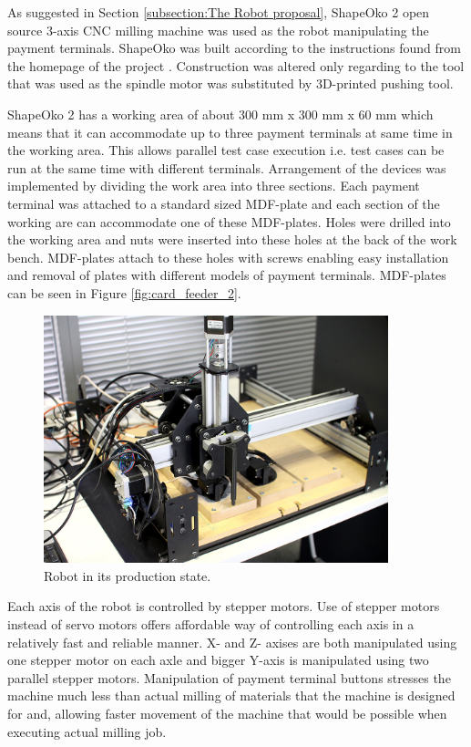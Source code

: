 As suggested in Section \ref{subsection:The Robot proposal}, ShapeOko 2 open source 3-axis CNC milling machine was used as the robot manipulating the payment terminals. ShapeOko was built according to the instructions found from the homepage of the project \citep{shapeoko}. Construction was altered only regarding to the tool that was used as the spindle motor was substituted by 3D-printed pushing tool.

ShapeOko 2 has a working area of about 300 mm x 300 mm x 60 mm which means that it can accommodate up to three payment terminals at same time in the working area. This allows parallel test case execution i.e. test cases can be run at the same time with different terminals. Arrangement of the devices was implemented by dividing the work area into three sections. Each payment terminal was attached to a standard sized MDF-plate and each section of the working are can accommodate one of these MDF-plates. Holes were drilled into the working area and nuts were inserted into these holes at the back of the work bench. MDF-plates attach to these holes with screws enabling easy installation and removal of plates with different models of payment terminals. MDF-plates can be seen in Figure \ref{fig:card_feeder_2}.

\begin{figure}[ht]
  \begin{center}
    \includegraphics[width=10cm]{images/robot.jpg}
    \caption{Robot in its production state.}
    \label{fig:robot_final}
  \end{center}
\end{figure}
\FloatBarrier

Each axis of the robot is controlled by stepper motors. Use of stepper motors instead of servo motors offers affordable way of controlling each axis in a relatively fast and reliable manner. X- and Z- axises are both manipulated using one stepper motor on each axle and bigger Y-axis is manipulated using two parallel stepper motors. Manipulation of payment terminal buttons stresses the machine much less than actual milling of materials that the machine is designed for and, allowing faster movement of the machine that would be possible when executing actual milling job.

